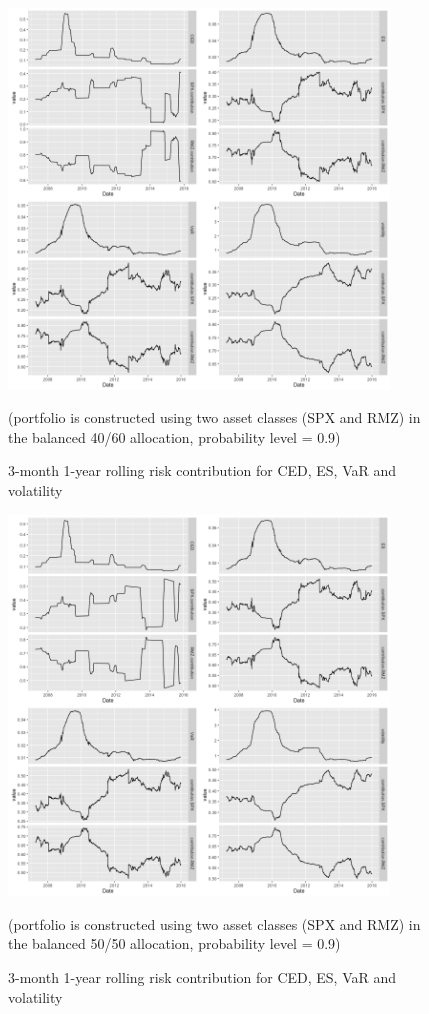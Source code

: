 \documentclass[11pt]{article}
\begin{document}
\begin{figure}[H]
\centering
\includegraphics[width = 0.9\textwidth]{../figures/risk_contribution/SPX_RMZ_46}
\caption{3-month 1-year rolling risk contribution for CED, ES, VaR and volatility}
(portfolio is constructed using two asset classes (SPX and RMZ) in the balanced 40/60 allocation, probability level = 0.9)
\label{fig:risk_contribution_SPX_RMZ_46}
\end{figure}

\begin{figure}[H]
\centering
\includegraphics[width = 0.9\textwidth]{../figures/risk_contribution/SPX_RMZ_55}
\caption{3-month 1-year rolling risk contribution for CED, ES, VaR and volatility}
(portfolio is constructed using two asset classes (SPX and RMZ) in the balanced 50/50 allocation, probability level = 0.9)
\label{fig:risk_contribution_SPX_RMZ_55}
\end{figure}
\end{document}

